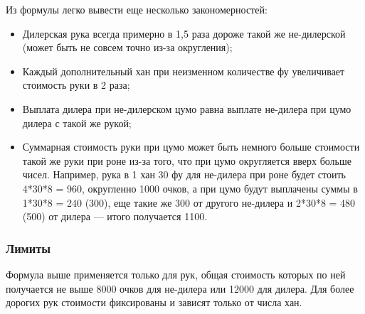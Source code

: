 Из формулы легко вывести еще несколько закономерностей:
\begin{itemize}
	\item Дилерская рука всегда примерно в 1,5 раза дороже такой же не-дилерской (может быть не совсем точно из-за округления);
	\item Каждый дополнительный хан при неизменном количестве фу увеличивает стоимость руки в 2 раза;
	\item Выплата дилера при не-дилерском цумо равна выплате не-дилера при цумо дилера с такой же рукой;
	\item Суммарная стоимость руки при цумо может быть немного больше стоимости такой же руки при роне из-за того, что при цумо округляется вверх больше чисел. Например, рука в 1 хан 30 фу для не-дилера при роне будет стоить 4*30*8 = 960, округленно 1000 очков, а при цумо будут выплачены суммы в 1*30*8 = 240 (300), еще такие же 300 от другого не-дилера и 2*30*8 = 480
	(500) от дилера --- итого получается 1100.	
\end{itemize}

\subsubsection{Лимиты}

Формула выше применяется только для рук, общая стоимость которых по ней получается не выше 8000 очков для не-дилера или 12000 для дилера. Для более дорогих рук стоимости фиксированы и зависят только от числа хан.



